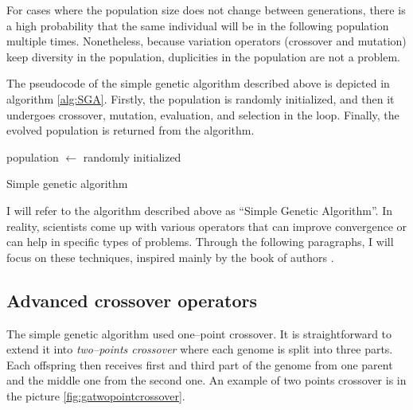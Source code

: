 For cases where the population size does not change between generations, there is a high probability that the same individual will be in the following population multiple times. Nonetheless, because variation operators (crossover and mutation) keep diversity in the population, duplicities in the population are not a problem.

The pseudocode of the simple genetic algorithm described above is depicted in algorithm \ref{alg:SGA}. Firstly, the population is randomly initialized, and then it undergoes crossover, mutation, evaluation, and selection in the loop. Finally, the evolved population is returned from the algorithm.

\begin{algorithm}
    population $\leftarrow$ randomly initialized\;
    \caption{Simple genetic algorithm}
    \label{alg:SGA}
\end{algorithm}

I will refer to the algorithm described above as \enquote{Simple Genetic Algorithm}. In reality, scientists come up with various operators that can improve convergence or can help in specific types of problems. Through the following paragraphs, I will focus on these techniques, inspired mainly by the book of authors \citet*{IntroToGA}.

\subsection{Advanced crossover operators}

The simple genetic algorithm used one--point crossover. It is straightforward to extend it into \emph{two--points crossover} where each genome is split into three parts. Each offspring then receives first and third part of the genome from one parent and the middle one from the second one. An example of two points crossover is in the picture \ref{fig:gatwopointcrossover}.

